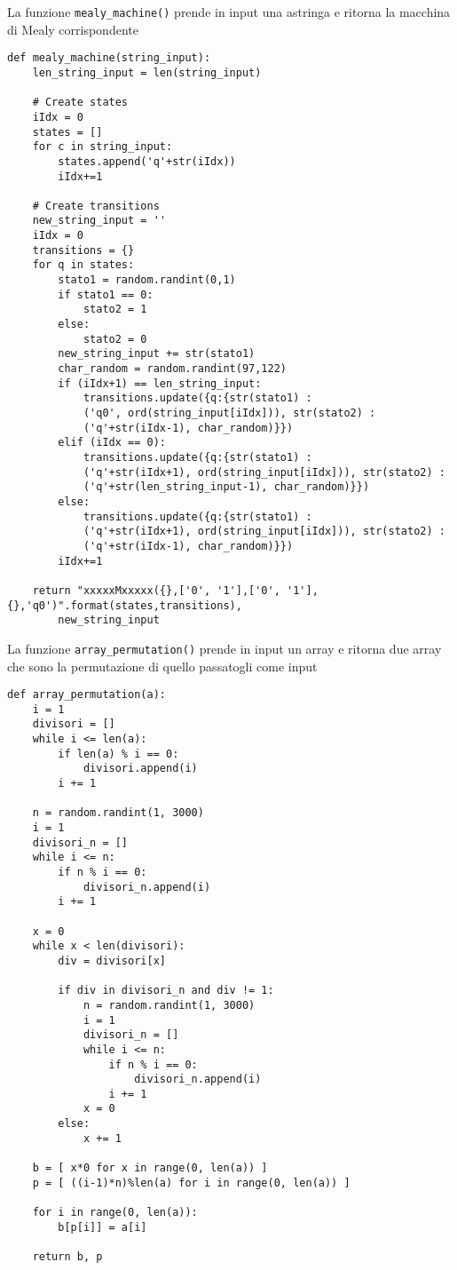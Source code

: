 \documentclass[a4paper,oneside,openright,titlepage,10pt,footinclude,headinclude]{scrbook}
\begin{document}
La funzione \texttt{mealy\_machine()} prende in input una astringa e ritorna la macchina di Mealy corrispondente
\begin{graybox}[innerleftmargin=2,]
\begin{lstlisting}
def mealy_machine(string_input):
    len_string_input = len(string_input)

    # Create states
    iIdx = 0
    states = []
    for c in string_input:
        states.append('q'+str(iIdx))
        iIdx+=1

    # Create transitions
    new_string_input = ''
    iIdx = 0
    transitions = {}
    for q in states:
        stato1 = random.randint(0,1)
        if stato1 == 0:
            stato2 = 1
        else:
            stato2 = 0
        new_string_input += str(stato1)
        char_random = random.randint(97,122)
        if (iIdx+1) == len_string_input:
            transitions.update({q:{str(stato1) : 
            ('q0', ord(string_input[iIdx])), str(stato2) : 
            ('q'+str(iIdx-1), char_random)}})
        elif (iIdx == 0):
            transitions.update({q:{str(stato1) : 
            ('q'+str(iIdx+1), ord(string_input[iIdx])), str(stato2) : 
            ('q'+str(len_string_input-1), char_random)}})
        else:
            transitions.update({q:{str(stato1) : 
            ('q'+str(iIdx+1), ord(string_input[iIdx])), str(stato2) : 
            ('q'+str(iIdx-1), char_random)}})
        iIdx+=1

    return "xxxxxMxxxxx({},['0', '1'],['0', '1'],{},'q0')".format(states,transitions), 
        new_string_input
\end{lstlisting}
\end{graybox}

La funzione \texttt{array\_permutation()} prende in input un array e ritorna due array che sono la permutazione di quello passatogli come input
\begin{graybox}[innerleftmargin=2,]
\begin{lstlisting}
def array_permutation(a):
    i = 1
    divisori = []
    while i <= len(a):
        if len(a) % i == 0:
            divisori.append(i)
        i += 1

    n = random.randint(1, 3000)
    i = 1
    divisori_n = []
    while i <= n:
        if n % i == 0:
            divisori_n.append(i)
        i += 1

    x = 0
    while x < len(divisori):
        div = divisori[x]

        if div in divisori_n and div != 1:
            n = random.randint(1, 3000)
            i = 1
            divisori_n = []
            while i <= n:
                if n % i == 0:
                    divisori_n.append(i)
                i += 1
            x = 0
        else:
            x += 1
            
    b = [ x*0 for x in range(0, len(a)) ]
    p = [ ((i-1)*n)%len(a) for i in range(0, len(a)) ]

    for i in range(0, len(a)):
        b[p[i]] = a[i]
    
    return b, p
\end{lstlisting}
\end{graybox}
\end{document}
